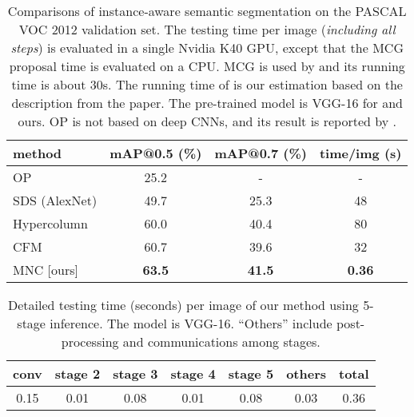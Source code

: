 \documentclass[10pt,twocolumn,letterpaper]{article}
\begin{document}
\setlength{\tabcolsep}{2pt}
\renewcommand{\arraystretch}{1.05}
\begin{table}[t]
\begin{center}
\small
\begin{tabular}{l|c|c|c}
method &\footnotesize mAP@0.5 (\%) &\footnotesize mAP@0.7 (\%) &\footnotesize time/img (s) \\
\hline
OP \cite{Carreira2012} & 25.2 & - & - \\
SDS (AlexNet) \cite{Hariharan2014} & 49.7 & 25.3 & 48 \\
Hypercolumn \cite{Hariharan2015} & 60.0 & 40.4 & 80 \\
CFM \cite{Dai2015} & 60.7 & 39.6 & 32 \\
\hline
MNC [ours] & \textbf{63.5} & \textbf{41.5} & \textbf{0.36} \\
\end{tabular}	
\end{center}
\vspace{-.5em}
\caption{Comparisons of instance-aware semantic segmentation on the PASCAL VOC 2012 validation set. The testing time per image (\emph{including all steps}) is evaluated in a single Nvidia K40 GPU, except that the MCG \cite{Arbelaez2014} proposal time is evaluated on a CPU. MCG is used by \cite{Hariharan2014,Hariharan2015,Dai2015} and its running time is about 30s. The running time of \cite{Hariharan2015} is our estimation based on the description from the paper.
The pre-trained model is VGG-16 for \cite{Hariharan2015,Dai2015} and ours. OP is not based on deep CNNs, and its result is reported by \cite{Hariharan2014}.}
\label{tab:voc_result}
\end{table}

\setlength{\tabcolsep}{6pt}
\renewcommand{\arraystretch}{1.05}
\begin{table}[t]
\begin{center}
\small
\begin{tabular}{cccccc|c}
conv & stage 2 & stage 3 & stage 4 & stage 5 & others & total \\
\hline
0.15 & 0.01 & 0.08 & 0.01 & 0.08 & 0.03 & 0.36 \\
\end{tabular}	
\end{center}
\vspace{-1em}
\caption{Detailed testing time (seconds) per image of our method using 5-stage inference. The model is VGG-16. ``Others'' include post-processing and communications among stages.}
\label{tab:time}
\end{table}
\end{document}
